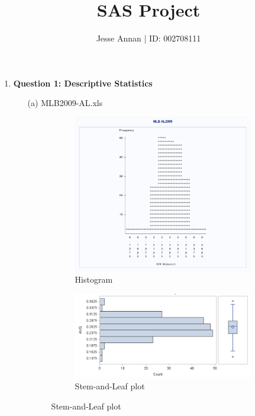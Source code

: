 \documentclass[10pt,a4paper]{article}
\title{{\LARGE SAS Project}}
\author{ {\LARGE Jesse Annan \hspace{0.5cm} | \hspace{0.5cm} ID: 002708111 }}
\begin{document}
	\maketitle
	\sffamily
	\clearpage
	
	\begin{enumerate}
		\item \textbf{Question 1: Descriptive Statistics} \newline
			\begin{enumerate}
				\item[(a)] MLB2009-AL.xls
					\begin{figure}[h!]
						\centering
						\begin{subfigure}{0.49\textwidth}
							\includegraphics[width=\textwidth]{hist_al2009}
							\caption{Histogram}
						\end{subfigure}
						\hfill
						\begin{subfigure}{0.49\textwidth}
							\includegraphics[width=\textwidth]{sal_al2009}
							\caption{Stem-and-Leaf plot}
						\end{subfigure}
					\end{figure}
					

\end{enumerate}
\end{enumerate}
\end{document}
